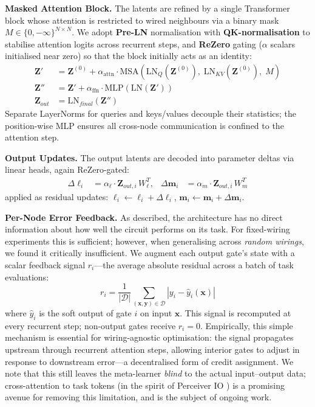 \textbf{Masked Attention Block.}
The latents are refined by a single Transformer block whose attention is restricted to wired neighbours via a binary mask $M \in \{0, -\infty\}^{N \times N}$.
We adopt \textbf{Pre-LN} normalisation \citep{xiong2020layernormalizationtransformerarchitecture} with \textbf{QK-normalisation} \citep{dehghani2023scalingvisiontransformers22} to stabilise attention logits across recurrent steps, and \textbf{ReZero} gating \citep{bachlechner_rezero_2020} ($\alpha$ scalars initialised near zero) so that the block initially acts as an identity:
\begin{align}
    \mathbf{Z}' &= \mathbf{Z}^{(0)} + \alpha_{\text{attn}} \cdot \text{MSA}\!\left(\text{LN}_Q(\mathbf{Z}^{(0)}),\; \text{LN}_{KV}(\mathbf{Z}^{(0)}),\; M\right) \\
    \mathbf{Z}'' &= \mathbf{Z}' + \alpha_{\text{ffn}} \cdot \text{MLP}\!\left(\text{LN}(\mathbf{Z}')\right) \\
    \mathbf{Z}_{out} &= \text{LN}_{final}(\mathbf{Z}'')
\end{align}
Separate LayerNorms for queries and keys/values decouple their statistics; the position-wise MLP ensures all cross-node communication is confined to the attention step.

\textbf{Output Updates.}
The output latents are decoded into parameter deltas via linear heads, again ReZero-gated:
\begin{align}
    \Delta \boldsymbol{\ell}_i &= \alpha_{\ell} \cdot \mathbf{Z}_{out,i}\, W_{\ell}^T, &
    \Delta \mathbf{m}_i &= \alpha_{m} \cdot \mathbf{Z}_{out,i}\, W_{m}^T
\end{align}
applied as residual updates: $\boldsymbol{\ell}_i \leftarrow \boldsymbol{\ell}_i + \Delta\boldsymbol{\ell}_i$, $\mathbf{m}_i \leftarrow \mathbf{m}_i + \Delta\mathbf{m}_i$.

\textbf{Per-Node Error Feedback.}
\label{sec:node_loss}
As described, the architecture has no direct information about how well the circuit performs on its task. For fixed-wiring experiments this is sufficient; however, when generalising across \emph{random wirings}, we found it critically insufficient. We augment each output gate's state with a scalar feedback signal $r_i$---the average absolute residual across a batch of task evaluations:
\begin{equation}
    r_i = \frac{1}{|\mathcal{D}|}\sum_{(\mathbf{x}, \mathbf{y}) \in \mathcal{D}} |y_i - \hat{y}_i(\mathbf{x})|
\end{equation}
where $\hat{y}_i$ is the soft output of gate $i$ on input $\mathbf{x}$. This signal is recomputed at every recurrent step; non-output gates receive $r_i = 0$. Empirically, this simple mechanism is essential for wiring-agnostic optimisation: the signal propagates upstream through recurrent attention steps, allowing interior gates to adjust in response to downstream error---a decentralised form of credit assignment. We note that this still leaves the meta-learner \textit{blind} to the actual input--output data; cross-attention to task tokens (in the spirit of Perceiver IO \citep{jaegle2022perceiveriogeneralarchitecture}) is a promising avenue for removing this limitation, and is the subject of ongoing work.

